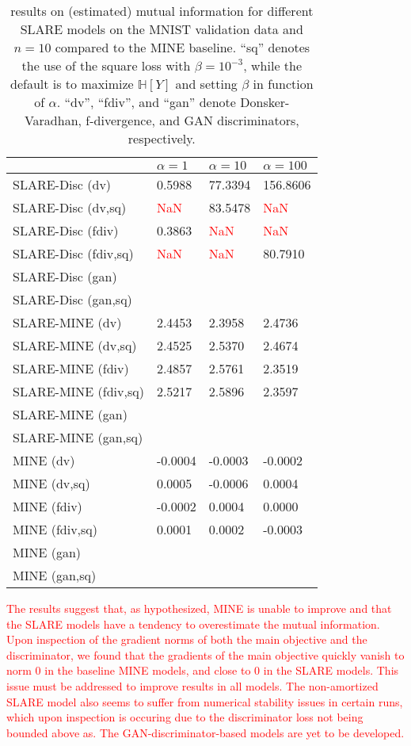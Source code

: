 \documentclass{NSF}
\begin{document}
\begin{table}
\centering
\begin{tabular}{|p{4cm}|p{2cm}|p{2cm}|p{2cm}|}
  \hline
  & $\alpha=1$ & $\alpha=10$ & $\alpha=100$ \\
  \hline
  SLARE-Disc (dv) & 0.5988 & 77.3394 & 156.8606 \\
  \hline
  SLARE-Disc (dv,sq) & \textcolor{red}{NaN} & 83.5478 & \textcolor{red}{NaN} \\
  \hline
  SLARE-Disc (fdiv) & 0.3863 & \textcolor{red}{NaN} & \textcolor{red}{NaN} \\
  \hline
  SLARE-Disc (fdiv,sq) & \textcolor{red}{NaN} & \textcolor{red}{NaN} & 80.7910 \\
  \hline
  SLARE-Disc (gan) & & & \\
  \hline
  SLARE-Disc (gan,sq) & & & \\
  \hline
  SLARE-MINE  (dv) & 2.4453 & 2.3958 & 2.4736 \\
  \hline
  SLARE-MINE (dv,sq) & 2.4525 & 2.5370 & 2.4674 \\
  \hline
  SLARE-MINE (fdiv) & 2.4857 & 2.5761 & 2.3519 \\
  \hline
  SLARE-MINE (fdiv,sq) & 2.5217 & 2.5896 & 2.3597 \\
  \hline
  SLARE-MINE (gan) & & & \\
  \hline
  SLARE-MINE (gan,sq) & & & \\
  \hline
  \hline
  MINE (dv) & -0.0004 & -0.0003 & -0.0002 \\
  \hline
  MINE (dv,sq) & 0.0005 & -0.0006 & 0.0004 \\
  \hline
  MINE (fdiv) & -0.0002 & 0.0004 & 0.0000 \\
  \hline
  MINE (fdiv,sq) & 0.0001 & 0.0002 & -0.0003 \\
  \hline
  MINE (gan) & & & \\
  \hline
  MINE (gan,sq) & & & \\
  \hline
\end{tabular}
\caption[Table 1]{results on (estimated) mutual information for different SLARE models on the MNIST validation data and $n=10$ compared to the MINE baseline. ``sq'' denotes the use of the square loss with $\beta=10^{-3}$, while the default is to maximize $\mathbb{H}[Y]$ and setting $\beta$ in function of $\alpha$. ``dv'', ``fdiv'', and ``gan'' denote Donsker-Varadhan, f-divergence, and GAN discriminators, respectively.}
\end{table}
\textcolor{red}{The results suggest that, as hypothesized, MINE is unable to improve and that the SLARE models have a tendency to overestimate the mutual information. Upon inspection of the gradient norms of both the main objective and the discriminator, we found that the gradients of the main objective quickly vanish to norm 0 in the baseline MINE models, and close to 0 in the SLARE models. This issue must be addressed to improve results in all models. The non-amortized SLARE model also seems to suffer from numerical stability issues in certain runs, which upon inspection is occuring due to the discriminator loss not being bounded above as. The GAN-discriminator-based models are yet to be developed.}
\end{document}
